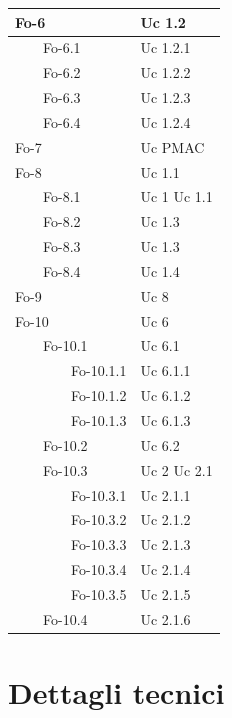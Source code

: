 {{\begin{longtable}{|p{5cm}|p{5cm}|}
\hline
Fo-6 & Uc 1.2\\
\hline
\ \ \ \ Fo-6.1 & Uc 1.2.1\\
\hline
\ \ \ \ Fo-6.2 & Uc 1.2.2\\
\hline
\ \ \ \ Fo-6.3 & Uc 1.2.3\\
\hline
\ \ \ \ Fo-6.4 & Uc 1.2.4\\
\hline
Fo-7 & Uc PMAC\\
\hline
Fo-8 & Uc 1.1\\
\hline
\ \ \ \ Fo-8.1 & Uc 1 \newline Uc 1.1\\
\hline
\ \ \ \ Fo-8.2 & Uc 1.3\\
\hline
\ \ \ \ Fo-8.3 & Uc 1.3\\
\hline
\ \ \ \ Fo-8.4 & Uc 1.4\\
\hline
Fo-9 & Uc 8\\
\hline
Fo-10 & Uc 6\\
\hline
\ \ \ \ Fo-10.1 & Uc 6.1\\
\hline
\ \ \ \ \ \ \ \ Fo-10.1.1 & Uc 6.1.1\\
\hline
\ \ \ \ \ \ \ \ Fo-10.1.2 & Uc 6.1.2\\
\hline
\ \ \ \ \ \ \ \ Fo-10.1.3 & Uc 6.1.3\\
\hline
\ \ \ \ Fo-10.2 & Uc 6.2\\
\hline
\ \ \ \ Fo-10.3 & Uc 2 \newline Uc 2.1\\
\hline
\ \ \ \ \ \ \ \ Fo-10.3.1 & Uc 2.1.1\\
\hline
\ \ \ \ \ \ \ \ Fo-10.3.2 & Uc 2.1.2\\
\hline
\ \ \ \ \ \ \ \ Fo-10.3.3 & Uc 2.1.3\\
\hline
\ \ \ \ \ \ \ \ Fo-10.3.4 & Uc 2.1.4\\
\hline
\ \ \ \ \ \ \ \ Fo-10.3.5 & Uc 2.1.5\\
\hline
\ \ \ \ Fo-10.4 & Uc 2.1.6\\

\end{longtable}






\chapter{Dettagli tecnici}

}}
